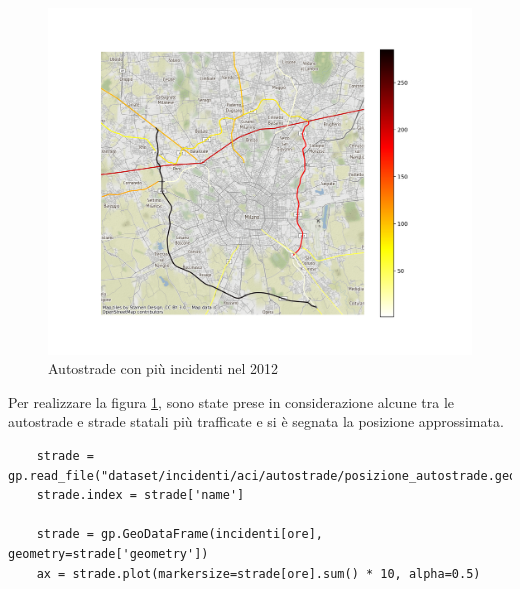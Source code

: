 \documentclass[a4paper]{report}
\begin{document}
\begin{figure}
    \includegraphics[width=\linewidth]{../src/incidenti/incidenti_aci/autostrade/incidenti_line_chart.png}
    \caption{Autostrade con più incidenti nel 2012}
    \label{fig:line-incidenti-milano}
\end{figure}

Per realizzare la figura \ref{fig:line-incidenti-milano}, sono state prese in considerazione alcune 
tra le autostrade e strade statali più trafficate e si è segnata la posizione approssimata.

\begin{lstlisting}
    strade = gp.read_file("dataset/incidenti/aci/autostrade/posizione_autostrade.geojson").to_crs(epsg=3857)
    strade.index = strade['name']

    strade = gp.GeoDataFrame(incidenti[ore], geometry=strade['geometry'])
    ax = strade.plot(markersize=strade[ore].sum() * 10, alpha=0.5)
\end{lstlisting}


\end{document}
